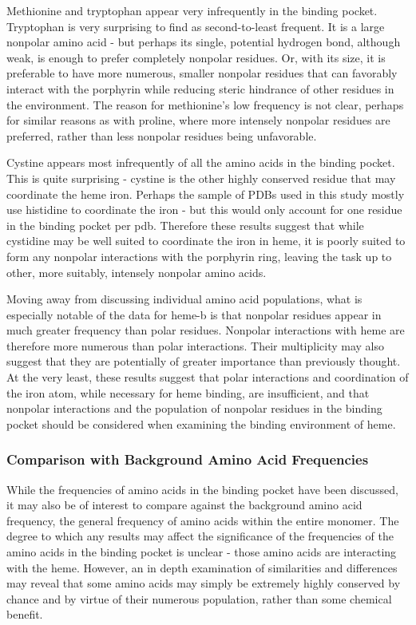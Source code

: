 \documentclass[a4paper, nobind]{templates/ociamthesis}
\begin{document}
Methionine and tryptophan appear very infrequently in the binding pocket. Tryptophan is very surprising to find as second-to-least frequent. It is a large nonpolar amino acid - but perhaps its single, potential hydrogen bond, although weak, is enough to prefer completely nonpolar residues. Or, with its size, it is preferable to have more numerous, smaller nonpolar residues that can favorably interact with the porphyrin while reducing steric hindrance of other residues in the environment. The reason for methionine's low frequency is not clear, perhaps for similar reasons as with proline, where more intensely nonpolar residues are preferred, rather than less nonpolar residues being unfavorable.

Cystine appears most infrequently of all the amino acids in the binding pocket. This is quite surprising - cystine is the other highly conserved residue that may coordinate the heme iron. Perhaps the sample of PDBs used in this study mostly use histidine to coordinate the iron - but this would only account for one residue in the binding pocket per pdb. Therefore these results suggest that while cystidine may be well suited to coordinate the iron in heme, it is poorly suited to form any nonpolar interactions with the porphyrin ring, leaving the task up to other, more suitably, intensely nonpolar amino acids.

Moving away from discussing individual amino acid populations, what is especially notable of the data for heme-b is that nonpolar residues appear in much greater frequency than polar residues. Nonpolar interactions with heme are therefore more numerous than polar interactions. Their multiplicity may also suggest that they are potentially of greater importance than previously thought. At the very least, these results suggest that polar interactions and coordination of the iron atom, while necessary for heme binding, are insufficient, and that nonpolar interactions and the population of nonpolar residues in the binding pocket should be considered when examining the binding environment of heme.

\hypertarget{comparison-with-background-amino-acid-frequencies}{%
\subsubsection{Comparison with Background Amino Acid Frequencies}\label{comparison-with-background-amino-acid-frequencies}}

While the frequencies of amino acids in the binding pocket have been discussed, it may also be of interest to compare against the background amino acid frequency, the general frequency of amino acids within the entire monomer. The degree to which any results may affect the significance of the frequencies of the amino acids in the binding pocket is unclear - those amino acids are interacting with the heme. However, an in depth examination of similarities and differences may reveal that some amino acids may simply be extremely highly conserved by chance and by virtue of their numerous population, rather than some chemical benefit.
\end{document}
